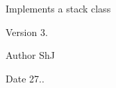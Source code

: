 Implements a stack class

\begin{DoxyVersion}{Version}
3.
\end{DoxyVersion}
\begin{DoxyAuthor}{Author}
ShJ 
\end{DoxyAuthor}
\begin{DoxyDate}{Date}
27.. 
\end{DoxyDate}
